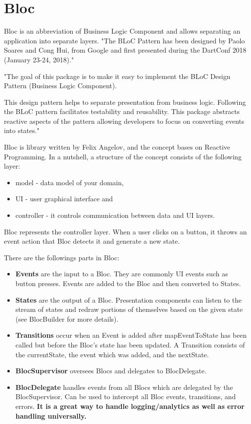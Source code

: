 \section{Bloc}\label{sec:bloc}
Bloc is an abbreviation of Business Logic Component and allows separating an application into separate layers.\cite{bloc}
"The BLoC Pattern has been designed by Paolo Soares and Cong Hui, from Google and first presented during the DartConf 2018 (January 23-24, 2018)."\cite{didierboelens}

"The goal of this package is to make it easy to implement the BLoC Design Pattern (Business Logic Component).

This design pattern helps to separate presentation from business logic.
Following the BLoC pattern facilitates testability and reusability.
This package abstracts reactive aspects of the pattern allowing developers to focus on converting events into states."\cite{bloc}

Bloc is library written by Felix Angelov, and the concept bases on Reactive Programming.\cite{bloc}
In a nutshell, a structure of the concept consists of the following layer:
\begin{itemize}
    \item model - data model of your domain,
    \item UI - user graphical interface and
    \item controller - it controls communication between data and UI layers.
\end{itemize}
Bloc represents the controller layer.
When a user clicks on a button, it throws an event action that Bloc detects it and generate a new state.

There are the followings parts in Bloc:
\begin{itemize}
    \item \textbf{Events} are the input to a Bloc.
    They are commonly UI events such as button presses.
    Events are added to the Bloc and then converted to States.
    \item \textbf{States} are the output of a Bloc.
    Presentation components can listen to the stream of states and redraw portions of themselves based on the given state (see BlocBuilder for more details).
    \item \textbf{Transitions} occur when an Event is added after mapEventToState has been called but before the Bloc's state has been updated.
    A Transition consists of the currentState, the event which was added, and the nextState.
    \item \textbf{BlocSupervisor} oversees Blocs and delegates to BlocDelegate.
    \item \textbf{BlocDelegate} handles events from all Blocs which are delegated by the BlocSupervisor.
    Can be used to intercept all Bloc events, transitions, and errors.
    \textbf{It is a great way to handle logging/analytics as well as error handling universally.}\cite{bloc}
\end{itemize}

